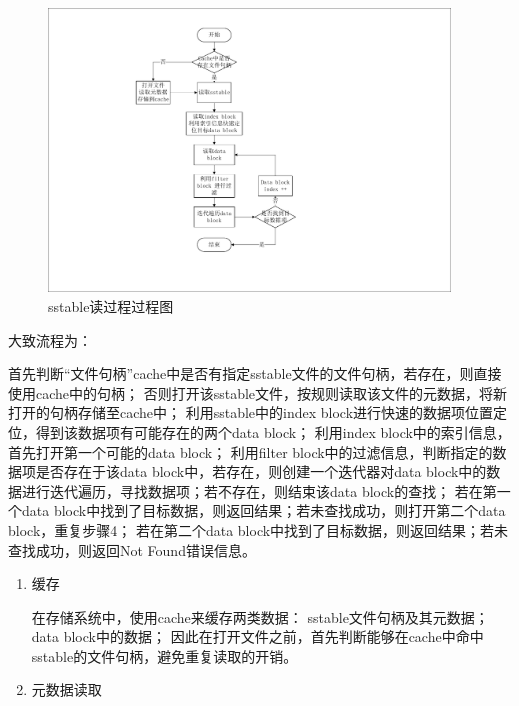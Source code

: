 \begin{enumerate}
\begin{enumerate}
\begin{figure}[H]
	\centering
	\includegraphics[width=0.95\textwidth]{pdf/sstable_read_procedure.pdf}
	\caption{sstable读过程过程图}
	\label{sstable_read_procedure}
\end{figure}

大致流程为：

首先判断“文件句柄”cache中是否有指定sstable文件的文件句柄，若存在，则直接使用cache中的句柄；
否则打开该sstable文件，按规则读取该文件的元数据，将新打开的句柄存储至cache中；
利用sstable中的index block进行快速的数据项位置定位，得到该数据项有可能存在的两个data block；
利用index block中的索引信息，首先打开第一个可能的data block；
利用filter block中的过滤信息，判断指定的数据项是否存在于该data block中，若存在，则创建一个迭代器对data block中的数据进行迭代遍历，寻找数据项；若不存在，则结束该data block的查找；
若在第一个data block中找到了目标数据，则返回结果；若未查找成功，则打开第二个data block，重复步骤4；
若在第二个data block中找到了目标数据，则返回结果；若未查找成功，则返回Not Found错误信息。

		\begin{enumerate}
			\item 缓存 
			

			在存储系统中，使用cache来缓存两类数据：
sstable文件句柄及其元数据；
data block中的数据；
因此在打开文件之前，首先判断能够在cache中命中sstable的文件句柄，避免重复读取的开销。

			\item 元数据读取 
			


\end{enumerate}
\end{enumerate}
\end{enumerate}
